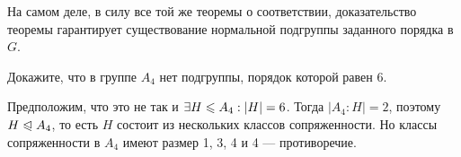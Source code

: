 \begin{note}
	На самом деле, в силу все той же теоремы о соответствии, доказательство теоремы гарантирует существование нормальной подгруппы заданного порядка в $G$.
\end{note}

\begin{exercise}
	Докажите, что в группе $A_4$ нет подгруппы, порядок которой равен 6.
\end{exercise}

\begin{solution}
	Предположим, что это не так и $\exists H \le A_4: |H| \hm= 6$. Тогда $|A_4 : H| = 2$, поэтому $H \trianglelefteqslant A_4$, то есть $H$ состоит из нескольких классов сопряженности. Но классы сопряженности в $A_4$ имеют размер 1, 3, 4 и 4 --- противоречие.
\end{solution}